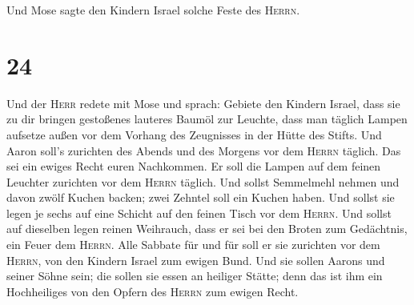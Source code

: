  Und Mose sagte den Kindern Israel solche Feste des
\textsc{Herrn}.

\hypertarget{section-23}{%
\section{24}\label{section-23}}

 Und der \textsc{Herr} redete mit Mose und sprach:
 Gebiete den Kindern Israel, dass sie zu dir bringen
gestoßenes lauteres Baumöl zur Leuchte, dass man täglich Lampen aufsetze
 außen vor dem Vorhang des Zeugnisses in der Hütte des
Stifts. Und Aaron soll's zurichten des Abends und des Morgens vor dem
\textsc{Herrn} täglich. Das sei ein ewiges Recht euren Nachkommen.
 Er soll die Lampen auf dem feinen Leuchter zurichten vor
dem \textsc{Herrn} täglich.  Und sollst Semmelmehl nehmen
und davon zwölf Kuchen backen; zwei Zehntel soll ein Kuchen haben.
 Und sollst sie legen je sechs auf eine Schicht auf den
feinen Tisch vor dem \textsc{Herrn}.  Und sollst auf
dieselben legen reinen Weihrauch, dass er sei bei den Broten zum
Gedächtnis, ein Feuer dem \textsc{Herrn}.  Alle Sabbate
für und für soll er sie zurichten vor dem \textsc{Herrn}, von den
Kindern Israel zum ewigen Bund.  Und sie sollen Aarons und
seiner Söhne sein; die sollen sie essen an heiliger Stätte; denn das ist
ihm ein Hochheiliges von den Opfern des \textsc{Herrn} zum ewigen Recht.

